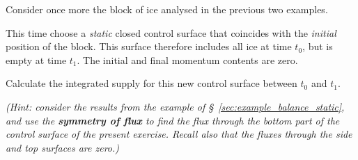 \documentclass[a4paper,12pt,%
onecolumn,oneside,%
british%
]{memoir}
\renewcommand*{\|}[1][]{\nonscript\:#1\vert\nonscript\:\mathopen{}}
\newcommand*{\sect}{\S}%
\newcommand*{\yti}{t_{0}}
\newcommand*{\ytf}{t_{1}}
\begin{document}
\medskip

\begin{exercise}
  Consider once more the block of ice analysed in the previous two examples.

  This time choose a \emph{static} closed control surface that coincides with the \emph{initial} position of the block. This surface therefore includes all ice at time $\yti$, but is empty at time $\ytf$. The initial and final momentum contents are zero.

  Calculate the integrated supply for this new control surface between $\yti$ and $\ytf$.

  \emph{(Hint: consider the results from the example of \sect~\ref{sec:example_balance_static}, and use the \textbf{symmetry of flux} to find the flux through the bottom part of the control surface of the present exercise. Recall also that the fluxes through the side and top surfaces are zero.)}
\end{exercise}

\bigskip
\end{document}
